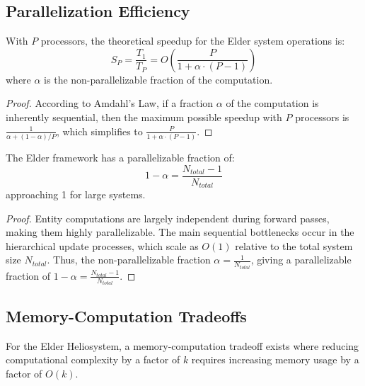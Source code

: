 \subsection{Parallelization Efficiency}

\begin{theorem}
With $P$ processors, the theoretical speedup for the Elder system operations is:
\begin{equation}
S_P = \frac{T_1}{T_P} = O\left(\frac{P}{1 + \alpha \cdot (P-1)}\right)
\end{equation}
where $\alpha$ is the non-parallelizable fraction of the computation.
\end{theorem}

\begin{proof}
According to Amdahl's Law, if a fraction $\alpha$ of the computation is inherently sequential, then the maximum possible speedup with $P$ processors is $\frac{1}{\alpha + (1-\alpha)/P}$, which simplifies to $\frac{P}{1 + \alpha \cdot (P-1)}$.
\end{proof}

\begin{theorem}
The Elder framework has a parallelizable fraction of:
\begin{equation}
1 - \alpha = \frac{N_{total} - 1}{N_{total}}
\end{equation}
approaching 1 for large systems.
\end{theorem}

\begin{proof}
Entity computations are largely independent during forward passes, making them highly parallelizable. The main sequential bottlenecks occur in the hierarchical update processes, which scale as $O(1)$ relative to the total system size $N_{total}$. Thus, the non-parallelizable fraction $\alpha = \frac{1}{N_{total}}$, giving a parallelizable fraction of $1 - \alpha = \frac{N_{total} - 1}{N_{total}}$.
\end{proof}

\subsection{Memory-Computation Tradeoffs}

\begin{theorem}
For the Elder Heliosystem, a memory-computation tradeoff exists where reducing computational complexity by a factor of $k$ requires increasing memory usage by a factor of $O(k)$.
\end{theorem}

